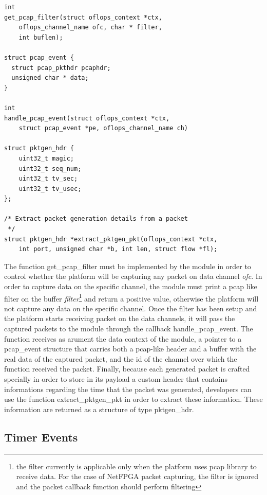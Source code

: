 \documentclass{book}
\begin{document}
\begin{lstlisting}[caption={packet capturing control methods}]
int 
get_pcap_filter(struct oflops_context *ctx, 
    oflops_channel_name ofc, char * filter, 
    int buflen);

struct pcap_event {
  struct pcap_pkthdr pcaphdr;
  unsigned char * data;
}

int 
handle_pcap_event(struct oflops_context *ctx, 
    struct pcap_event *pe, oflops_channel_name ch) 

struct pktgen_hdr {
    uint32_t magic;
    uint32_t seq_num;
    uint32_t tv_sec;
    uint32_t tv_usec;
};

/* Extract packet generation details from a packet 
 */
struct pktgen_hdr *extract_pktgen_pkt(oflops_context *ctx, 
    int port, unsigned char *b, int len, struct flow *fl);
\end{lstlisting}

The function get\_pcap\_filter must be implemented by the module in order to
control whether the platform will be capturing any packet on data channel
\textit{ofc}. In order to capture data on the specific channel, the module must
print a pcap like filter on the buffer \textit{filter}\footnote{the filter
currently is applicable only when the platform uses pcap library to
receive data. For the case of NetFPGA packet capturing, the filter is ignored
and the packet callback function should perform filtering} and return a positive
value, otherwise the platform will not capture any data on the specific
channel. Once the filter has been setup and the platform starts receiving
packet on the data channels, it will pass the captured packets to the module
through the callback handle\_pcap\_event. The function receives as arument the
data context of the module, a pointer to a pcap\_event structure that carries
both a pcap-like header and a buffer with the real data of the captured
packet, and the id of the channel over which the function received the
packet. Finally, because each generated packet is crafted specially in order to
store in its payload a custom header that contains informations regarding the
time that the packet was generated, developers can use the function
extract\_pktgen\_pkt in order to extract these information. These information
are returned as a structure of type pktgen\_hdr.

\subsection{Timer Events}
\end{document}

